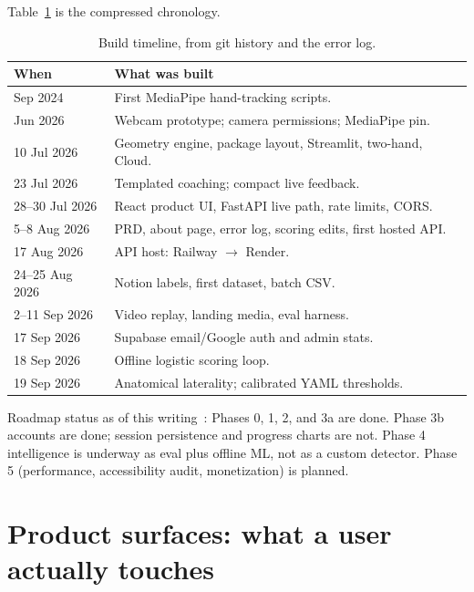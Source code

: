 \documentclass[11pt,a4paper]{article}
\begin{document}
Table~\ref{tab:timeline} is the compressed chronology.

\begin{table}[ht]
\centering
\caption{Build timeline, from git history and the error log.}
\label{tab:timeline}
\begin{tabularx}{\textwidth}{@{}l>{\raggedright\arraybackslash}X@{}}
\toprule
\textbf{When} & \textbf{What was built} \\
\midrule
Sep 2024 & First MediaPipe hand-tracking scripts. \\
Jun 2026 & Webcam prototype; camera permissions; MediaPipe pin. \\
10 Jul 2026 & Geometry engine, package layout, Streamlit, two-hand, Cloud. \\
23 Jul 2026 & Templated coaching; compact live feedback. \\
28--30 Jul 2026 & React product UI, FastAPI live path, rate limits, CORS. \\
5--8 Aug 2026 & PRD, about page, error log, scoring edits, first hosted API. \\
17 Aug 2026 & API host: Railway \(\to\) Render. \\
24--25 Aug 2026 & Notion labels, first dataset, batch CSV. \\
2--11 Sep 2026 & Video replay, landing media, eval harness. \\
17 Sep 2026 & Supabase email/Google auth and admin stats. \\
18 Sep 2026 & Offline logistic scoring loop. \\
19 Sep 2026 & Anatomical laterality; calibrated YAML thresholds. \\
\bottomrule
\end{tabularx}
\end{table}

Roadmap status as of this writing~\cite{roadmap}: Phases 0, 1, 2, and 3a are done.
Phase 3b accounts are done; session persistence and progress charts are not.
Phase 4 intelligence is underway as eval plus offline ML, not as a custom detector.
Phase 5 (performance, accessibility audit, monetization) is planned.

\section{Product surfaces: what a user actually touches}
\label{sec:product}
\end{document}

